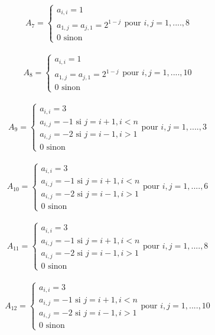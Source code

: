     \\
    \begin{equation*}
        A_7=
        \begin{cases}
            a_{i,i}=1 \\
            a_{1,j}=a_{j,1}=2^{1-j}\\
            0 \text{ sinon}
        \end{cases} \text{pour }i,j=1,....,8
    \end{equation*}
    \\
    \begin{equation*}
        A_8=
        \begin{cases}
            a_{i,i}=1 \\
            a_{1,j}=a_{j,1}=2^{1-j}\\
            0 \text{ sinon}
        \end{cases} \text{pour }i,j=1,....,10
    \end{equation*}
    \\
    \begin{equation*}
        A_9=
        \begin{cases}
            a_{i,i}=3 \\
            a_{i,j}=-1 \text{ si } j=i+1, i<n\\
            a_{i,j}=-2 \text{ si } j=i-1, i>1 \\
            0 \text{ sinon}
        \end{cases} \text{pour }i,j=1,....,3
    \end{equation*}
    \\
    \begin{equation*}
        A_{10}=
        \begin{cases}
            a_{i,i}=3 \\
            a_{i,j}=-1 \text{ si } j=i+1, i<n\\
            a_{i,j}=-2 \text{ si } j=i-1, i>1 \\
            0 \text{ sinon}
        \end{cases} \text{pour }i,j=1,....,6
    \end{equation*}
    \\
    \begin{equation*}
        A_{11}=
        \begin{cases}
            a_{i,i}=3 \\
            a_{i,j}=-1 \text{ si } j=i+1, i<n\\
            a_{i,j}=-2 \text{ si } j=i-1, i>1 \\
            0 \text{ sinon}
        \end{cases} \text{pour }i,j=1,....,8
    \end{equation*}
    \\
    \begin{equation*}
        A_{12}=
        \begin{cases}
            a_{i,i}=3 \\
            a_{i,j}=-1 \text{ si } j=i+1, i<n\\
            a_{i,j}=-2 \text{ si } j=i-1, i>1 \\
            0 \text{ sinon}
        \end{cases} \text{pour }i,j=1,....,10
    \end{equation*}